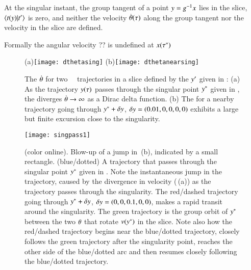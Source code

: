 At the
singular instant, the group tangent of a point $y=g^{-1} x$
lies in the slice, $\braket{\groupTan(\sspRed)}{\sliceTan{}}$ is zero,
and neither the velocity $\dot{{\bf \theta}}(\tau)$ along the group tangent
nor the velocity in the slice are defined.

Formally the angular velocity ?? is undefined at $x(\tau^*)$


 \begin{figure}
 \begin{center}
(a)\texttt{[image: dthetasing]}%
(b)\texttt{[image: dthetanearsing]}%
 \end{center}
 \caption{\label{fig:dthetasing}
The {\groupVel} $\dot{{\bf \theta}}$ for two \cLf\
\reducedsp\ trajectories in a slice defined by the
{\template} ${y'}$ given in :
 (a) As the trajectory $y(\tau)$ passes through the
singular point  $y^*$ given in \refeq{exmplTempl},
the {\groupVel} diverges
$\dot{{\bf \theta}} \to \infty$ as a Dirac delta function.
(b) The {\groupVel} for a nearby trajectory going
through $y^*+\delta y$,
$\delta y=(0.01,0,0,0,0)$ exhibits a large
but finite excursion close to the singularity.
 }%
 \end{figure}

 \begin{figure}
 \begin{center}
\texttt{[image: singpass1]}
 \end{center}
 \caption{\label{fig:singpass}
(color online).
Blow-up of a jump in \,(b), indicated by
a small rectangle.
(blue/dotted) A trajectory that passes through the singular point
$y^*$ given in \refeq{exmplTempl}.
Note the instantaneous jump in the trajectory,  caused by the divergence in
velocity (\reffig{fig:dthetasing}\,(a)) as the trajectory
passes through the singularity. The red/dashed trajectory going
through $y^*+\delta y$, $\delta y =(0,0,0.1,0,0)$,
makes a rapid transit around the singularity. The green trajectory is the group orbit of
$y^*$ between the two ${\bf \theta}$ that rotate $v(y^*)$ in the
slice. Note also how the red/dashed trajectory begins near the
blue/dotted trajectory, closely follows the green trajectory after the
singularity point, reaches the other side of the blue/dotted arc and then
resumes closely following the blue/dotted trajectory.
 }%
 \end{figure}

